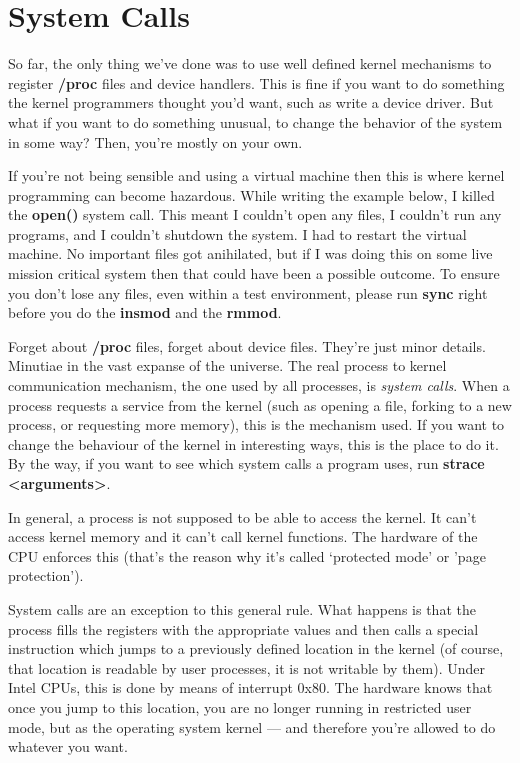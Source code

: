 \documentclass[11pt]{article}
\begin{document}
\section*{System Calls}
\label{sec-10}
So far, the only thing we've done was to use well defined kernel mechanisms to register \textbf{/proc} files and device handlers. This is fine if you want to do something the kernel programmers thought you'd want, such as write a device driver. But what if you want to do something unusual, to change the behavior of the system in some way? Then, you're mostly on your own.

If you're not being sensible and using a virtual machine then this is where kernel programming can become hazardous. While writing the example below, I killed the \textbf{open()} system call. This meant I couldn't open any files, I couldn't run any programs, and I couldn't shutdown the system. I had to restart the virtual machine. No important files got anihilated, but if I was doing this on some live mission critical system then that could have been a possible outcome. To ensure you don't lose any files, even within a test environment, please run \textbf{sync} right before you do the \textbf{insmod} and the \textbf{rmmod}.

Forget about \textbf{/proc} files, forget about device files. They're just minor details. Minutiae in the vast expanse of the universe. The real process to kernel communication mechanism, the one used by all processes, is \emph{system calls}. When a process requests a service from the kernel (such as opening a file, forking to a new process, or requesting more memory), this is the mechanism used. If you want to change the behaviour of the kernel in interesting ways, this is the place to do it. By the way, if you want to see which system calls a program uses, run \textbf{strace <arguments>}.

In general, a process is not supposed to be able to access the kernel. It can't access kernel memory and it can't call kernel functions. The hardware of the CPU enforces this (that's the reason why it's called `protected mode' or 'page protection').

System calls are an exception to this general rule. What happens is that the process fills the registers with the appropriate values and then calls a special instruction which jumps to a previously defined location in the kernel (of course, that location is readable by user processes, it is not writable by them). Under Intel CPUs, this is done by means of interrupt 0x80. The hardware knows that once you jump to this location, you are no longer running in restricted user mode, but as the operating system kernel --- and therefore you're allowed to do whatever you want.
\end{document}
